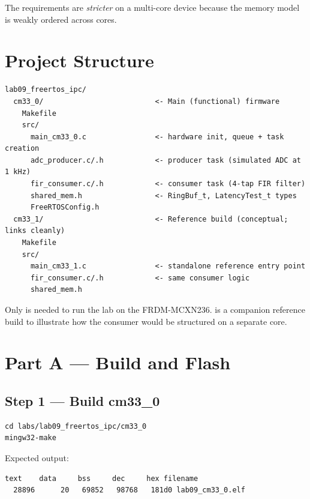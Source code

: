 \documentclass[11pt, a4paper]{article}
\begin{document}
The  requirements are \emph{stricter} on a multi-core device because
the memory model is weakly ordered across cores.

\section{Project Structure}

\begin{lstlisting}[style=textstyle]
lab09_freertos_ipc/
  cm33_0/                          <- Main (functional) firmware
    Makefile
    src/
      main_cm33_0.c                <- hardware init, queue + task creation
      adc_producer.c/.h            <- producer task (simulated ADC at 1 kHz)
      fir_consumer.c/.h            <- consumer task (4-tap FIR filter)
      shared_mem.h                 <- RingBuf_t, LatencyTest_t types
      FreeRTOSConfig.h
  cm33_1/                          <- Reference build (conceptual; links cleanly)
    Makefile
    src/
      main_cm33_1.c                <- standalone reference entry point
      fir_consumer.c/.h            <- same consumer logic
      shared_mem.h
\end{lstlisting}

\begin{tipbox}
  Only  is needed to run the lab on the FRDM-MCXN236.
   is a companion reference build to illustrate how the consumer
  would be structured on a separate core.
\end{tipbox}

\section{Part A --- Build and Flash}

\subsection{Step 1 --- Build cm33\_0}

\begin{lstlisting}[style=bashstyle]
cd labs/lab09_freertos_ipc/cm33_0
mingw32-make
\end{lstlisting}

Expected output:
\begin{lstlisting}[style=textstyle]
   text    data     bss     dec     hex filename
  28896      20   69852   98768   181d0 lab09_cm33_0.elf
\end{lstlisting}
\end{document}
